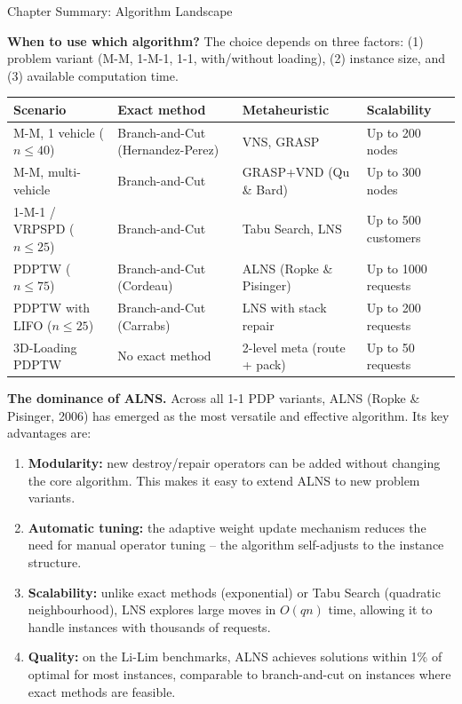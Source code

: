 \documentclass[aspectratio=169,10pt]{beamer}
\begin{document}
\begin{frame}[allowframebreaks]{Chapter Summary: Algorithm Landscape}

  \textbf{When to use which algorithm?} The choice depends on three factors:
  (1) problem variant (M-M, 1-M-1, 1-1, with/without loading), (2) instance size, and
  (3) available computation time.

  \begin{center}\footnotesize
    \renewcommand{\arraystretch}{1.3}
    \begin{tabular}{>{\raggedright}p{2.5cm}
                    >{\raggedright}p{2.8cm}
                    >{\raggedright}p{2.8cm}
                    >{\raggedright\arraybackslash}p{2.2cm}}
      \toprule
      \textbf{Scenario} & \textbf{Exact method} & \textbf{Metaheuristic} & \textbf{Scalability} \\
      \midrule
      M-M, 1 vehicle ($n \leq 40$)   & Branch-and-Cut (Hernandez-Perez) & VNS, GRASP & Up to 200 nodes \\
      M-M, multi-vehicle            & Branch-and-Cut & GRASP+VND (Qu \& Bard) & Up to 300 nodes \\
      1-M-1 / VRPSPD ($n \leq 25$) & Branch-and-Cut & Tabu Search, LNS & Up to 500 customers \\
      PDPTW ($n \leq 75$)           & Branch-and-Cut (Cordeau) & ALNS (Ropke \& Pisinger) & Up to 1000 requests \\
      PDPTW with LIFO ($n \leq 25$) & Branch-and-Cut (Carrabs) & LNS with stack repair & Up to 200 requests \\
      3D-Loading PDPTW             & No exact method & 2-level meta (route + pack) & Up to 50 requests \\
      \bottomrule
    \end{tabular}
  \end{center}

  \framebreak

  \textbf{The dominance of ALNS.} Across all 1-1 PDP variants, ALNS (Ropke \& Pisinger, 2006)
  has emerged as the most versatile and effective algorithm. Its key advantages are:
  \begin{enumerate}
    \item \textbf{Modularity:} new destroy/repair operators can be added without changing the
          core algorithm. This makes it easy to extend ALNS to new problem variants.
    \item \textbf{Automatic tuning:} the adaptive weight update mechanism reduces the need
          for manual operator tuning -- the algorithm self-adjusts to the instance structure.
    \item \textbf{Scalability:} unlike exact methods (exponential) or Tabu Search
          (quadratic neighbourhood), LNS explores large moves in $O(qn)$ time, allowing
          it to handle instances with thousands of requests.
    \item \textbf{Quality:} on the Li-Lim benchmarks, ALNS achieves solutions within 1\%
          of optimal for most instances, comparable to branch-and-cut on instances where
          exact methods are feasible.
  \end{enumerate}


\end{frame}
\end{document}
